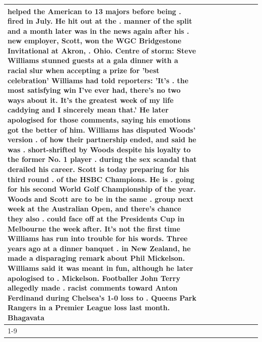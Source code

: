 \begin{table}[H]
\begin{tabular}{lllrlllll}
helped the American to 13 majors before being . fired in July. He hit out at the . manner of the split and a month later was in the news again after his . new employer, Scott, won the WGC Bridgestone Invitational at Akron, . Ohio. Centre of storm: Steve Williams stunned guests at a gala dinner with a racial slur when accepting a prize for 'best celebration' Williams had told reporters: 'It's . the most satisfying win I've ever had, there's no two ways about it. It's the greatest week of my life caddying and I sincerely mean that.' He later apologised for those comments, saying his emotions got the better of him. Williams has disputed Woods' version . of how their partnership ended, and said he was . short-shrifted by Woods despite his loyalty to the former No. 1 player . during the sex scandal that derailed his career. Scott is today preparing for his third round . of the HSBC Champions. He is . going for his second World Golf Championship of the year. Woods and Scott are to be in the same . group next week at the Australian Open, and there's chance they also . could face off at the Presidents Cup in Melbourne the week after. It's not the first time Williams has run into trouble for his words. Three years ago at a dinner banquet . in New Zealand, he made a disparaging remark about Phil Mickelson. Williams said it was meant in fun, although he later apologised to . Mickelson. Footballer John Terry allegedly made . racist comments toward Anton Ferdinand during Chelsea's 1-0 loss to . Queens Park Rangers in a Premier League loss last month. Bhagavata \\
\cline{1-9}

\end{tabular}
\end{table}

